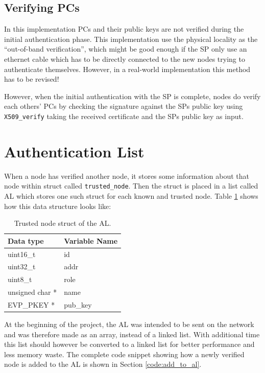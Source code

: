 \subsection{Verifying PCs}
In this implementation PCs and their public keys are not verified during the
initial authentication phase. This implementation use the physical locality as
the ``out-of-band verification'', which might be good enough if the SP only
use an ethernet cable which has to be directly connected to the new nodes trying
to authenticate themselves. However, in a real-world implementation this method
has to be revised!

However, when the initial authentication with the SP is complete, nodes do
verify each others' PCs by checking the signature against the SPs public key
using \texttt{X509\_verify} taking the received certificate and the SPs public
key as input.

\section{Authentication List}
When a node has verified another node, it stores some information about that
node within struct called \texttt{trusted\_node}. Then the struct is placed in a
list called \ac{AL} which stores one such struct for each known and trusted
node. Table \ref{tab:impl_al_content} shows how this data structure looks like:
\begin{table}[h]
	\centering
	\begin{tabular}{| l | l |}\hline
 		\textbf{Data type} & \textbf{Variable Name}\\\hline
		uint16\_t & id\\\hline
		uint32\_t & addr\\\hline
		uint8\_t & role\\\hline 
		unsigned char * & name\\\hline 
		EVP\_PKEY * & pub\_key\\\hline  
	\end{tabular}
	\caption{Trusted node struct of the AL.}
	\label{tab:impl_al_content}
\end{table}
At the beginning of the project, the AL was intended to be sent on the network
and was therefore made as an array, instead of a linked list. With additional
time this list should however be converted to a linked list for better
performance and less memory waste. The complete code snippet showing how a newly
verified node is added to the AL is shown in Section \ref{code:add_to_al}.


